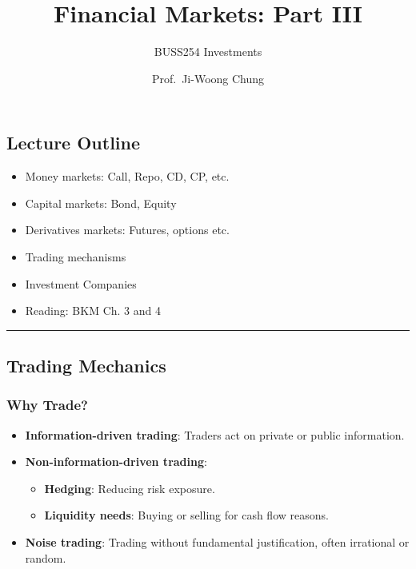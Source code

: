 \documentclass[
  letterpaper,
  DIV=11,
  numbers=noendperiod]{scrartcl}
\title{Financial Markets: Part III}
\subtitle{BUSS254 Investments}
\author{Prof.~Ji-Woong Chung}
\date{}
\providecommand{\tightlist}{%
  \setlength{\itemsep}{0pt}\setlength{\parskip}{0pt}}\usepackage{longtable,booktabs,array}
\begin{document}
\maketitle


\subsection{Lecture Outline}\label{lecture-outline}

\begin{itemize}
\tightlist
\item
  Money markets: Call, Repo, CD, CP, etc.
\item
  Capital markets: Bond, Equity
\item
  Derivatives markets: Futures, options etc.
\item
  Trading mechanisms
\item
  Investment Companies
\item
  Reading: BKM Ch. 3 and 4
\end{itemize}

\begin{center}\rule{0.5\linewidth}{0.5pt}\end{center}

\subsection{Trading Mechanics}\label{trading-mechanics}

\subsubsection{Why Trade?}\label{why-trade}

\begin{itemize}
\tightlist
\item
  \textbf{Information-driven trading}: Traders act on private or public
  information.
\item
  \textbf{Non-information-driven trading}:

  \begin{itemize}
  \tightlist
  \item
    \textbf{Hedging}: Reducing risk exposure.
  \item
    \textbf{Liquidity needs}: Buying or selling for cash flow reasons.
  \end{itemize}
\item
  \textbf{Noise trading}: Trading without fundamental justification,
  often irrational or random.
\end{itemize}
\end{document}

